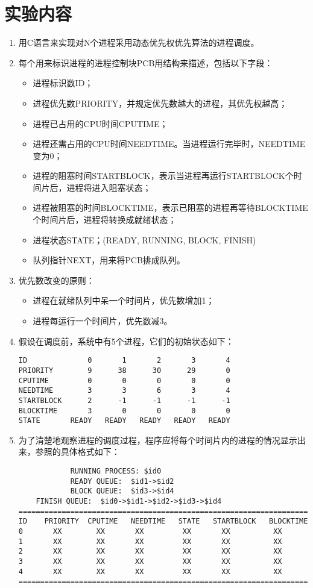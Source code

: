 \documentclass[c5size,a4paper,nofonts]{ctexart}
\begin{document}
\section{实验内容}
\begin{enumerate}[label={(\arabic*)}]
\item 用C语言来实现对N个进程采用动态优先权优先算法的进程调度。
\item 每个用来标识进程的进程控制块PCB用结构来描述，包括以下字段：
\begin{itemize}
\item 进程标识数ID；
\item 进程优先数PRIORITY，并规定优先数越大的进程，其优先权越高；
\item 进程已占用的CPU时间CPUTIME；
\item 进程还需占用的CPU时间NEEDTIME。当进程运行完毕时，NEEDTIME变为0；
\item 进程的阻塞时间STARTBLOCK，表示当进程再运行STARTBLOCK个时间片后，进程将进入阻塞状态；
\item 进程被阻塞的时间BLOCKTIME，表示已阻塞的进程再等待BLOCKTIME个时间片后，进程将转换成就绪状态；
\item 进程状态STATE；(READY, RUNNING, BLOCK, FINISH)
\item 队列指针NEXT，用来将PCB排成队列。
\end{itemize}
\item 优先数改变的原则：
\begin{itemize}
\item 进程在就绪队列中呆一个时间片，优先数增加1；
\item 进程每运行一个时间片，优先数减3。
\end{itemize}
\item 假设在调度前，系统中有5个进程，它们的初始状态如下：
\begin{verbatim}
ID              0       1       2       3       4
PRIORITY        9      38      30      29       0
CPUTIME         0       0       0       0       0
NEEDTIME        3       3       6       3       4
STARTBLOCK      2      -1      -1      -1      -1
BLOCKTIME       3       0       0       0       0
STATE       READY   READY   READY   READY   READY
\end{verbatim}
\item 为了清楚地观察进程的调度过程，程序应将每个时间片内的进程的情况显示出来，参照的具体格式如下：
\begin{verbatim}
            RUNNING PROCESS: $id0
            READY QUEUE:  $id1->$id2
            BLOCK QUEUE:  $id3->$id4
    FINISH QUEUE:  $id0->$id1->$id2->$id3->$id4
====================================================================
ID    PRIORITY  CPUTIME   NEEDTIME   STATE   STARTBLOCK   BLOCKTIME
0       XX        XX       XX         XX       XX          XX
1       XX        XX       XX         XX       XX          XX
2       XX        XX       XX         XX       XX          XX
3       XX        XX       XX         XX       XX          XX
4       XX        XX       XX         XX       XX          XX   
====================================================================
\end{verbatim}

\end{enumerate}
\end{document}

